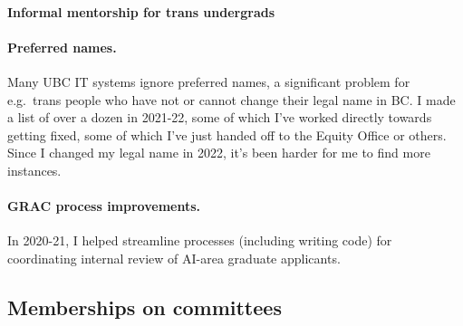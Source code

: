 \documentclass[10pt]{article}
\begin{document}


\paragraph{Informal mentorship for trans undergrads}

\paragraph{Preferred names.}
{%
Many UBC IT systems ignore preferred names,
a significant problem for e.g.\ trans people who have not or cannot change their legal name in BC.
I made a list of over a dozen in 2021-22,
some of which I've worked directly towards getting fixed,
some of which I've just handed off to the Equity Office or others.
Since I changed my legal name in 2022, it's been harder for me to find more instances.
}

\paragraph{GRAC process improvements.}
In 2020-21, I helped streamline processes (including writing code) for coordinating internal review of AI-area graduate applicants.


\subsection{Memberships on committees} %
\end{document}
